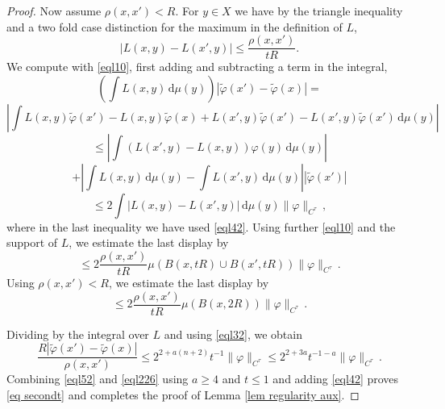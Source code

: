 \begin{proof}
Now assume  $\rho(x,x')< R$. For $y\in X$ we have by the triangle inequality and a two fold case distinction
for the maximum in the definition of $L$,
\begin{equation}\label{eql10}
    |L(x,y) - L(x',y)| \le \frac{\rho(x,x')}{tR}.
\end{equation}
We compute with \eqref{eql10}, first adding and subtracting a term in the integral,
    \begin{equation}\left(\int L(x,y) \, \mathrm{d}\mu(y)\right)
        |\tilde{\varphi}(x') - \tilde \varphi(x)|=
    \end{equation}
    \begin{equation}\left|\int L(x,y) \tilde{\varphi}(x')
    -L(x,y) \tilde{\varphi}(x)
    +L(x',y) \tilde{\varphi}(x')-
        L(x',y) \tilde{\varphi}(x')
    \, \mathrm{d}\mu(y)\right|
    \end{equation}
    \begin{equation}\label{eql21}\le  \left| \int (L(x',y)-L(x,y)) \varphi(y) \, \mathrm{d}\mu(y)\right|
    \end{equation}
    \begin{equation}\label{eql22}+  \left| \int L(x,y)  \, \mathrm{d}\mu(y)-\int L(x',y)  \, \mathrm{d}\mu(y)\right||\tilde{\varphi}(x')|
    \end{equation}
\begin{equation}\label{eql23}\le 2  \int |L(x,y)  -L(x',y)|  \, \mathrm{d}\mu(y)
\|\varphi\|_{C^\tau}\, ,
    \end{equation}
where in the last inequality we have used  \eqref{eql42}.
Using further \eqref{eql10} and the support of $L$, we estimate the last display by
\begin{equation}\label{eql224}\le 2  \frac{\rho(x,x')} {tR}\mu(B(x,tR)\cup B(x',tR))
\|\varphi\|_{C^\tau}\, .
    \end{equation}
    Using $\rho(x,x')<R$, we estimate the last display by
\begin{equation}\label{eql225}\le 2
\frac{\rho(x,x')} {tR}
\mu(B(x,2R))
\|\varphi\|_{C^\tau}\, .
    \end{equation}

Dividing by the integral over $L$ and using \eqref{eql32}, we obtain
\begin{equation}\label{eql226}
    \frac {R |\tilde{\varphi}(x') - \tilde \varphi(x)|}{\rho(x,x')}
    \le   2^{2+a(n+2)}t^{-1}\|\varphi\|_{C^\tau} \le
    2^{2+3a} t^{-1-a} \|\varphi\|_{C^\tau}\, .
\end{equation}
Combining \eqref{eql52} and  \eqref{eql226} using $a\ge 4$ and $t\le 1$ and
adding \eqref{eql42} proves \eqref{eq secondt} and completes the proof
of Lemma \ref{lem regularity aux}.
\end{proof}


